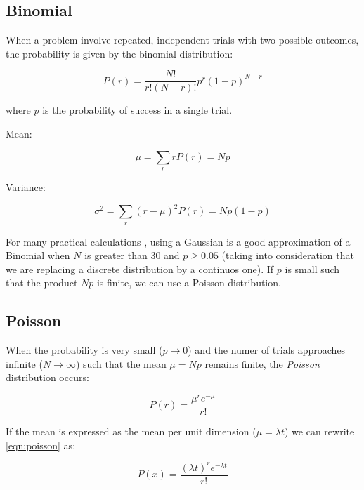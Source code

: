 \subsection{Binomial}

When a problem involve repeated, independent trials with two possible outcomes, the probability is given by the binomial distribution:

\begin{equation}
	P(r)= \frac{N! }{ r! \left( N-r \right)! } p^r (1-p)^{N-r}
\end{equation}

where $p$ is the probability of success in a single trial.

Mean:

\begin{equation}
	\mu = \sum_{r}rP(r) = Np
\end{equation}

Variance:

\begin{equation}
	\sigma^2=\sum_r(r-\mu)^2P(r) = Np(1-p)
\end{equation}

For many practical calculations \cite{leo2012techniques}, using a Gaussian is a good approximation of a Binomial when $N$ is greater than 30 and $p\geq0.05$ (taking into consideration that we are replacing a discrete distribution by a continuos one). If $p$ is small such that the product $Np$ is finite, we can use a Poisson distribution.

\subsection{Poisson}
\label{distributions1}

When the probability is very small ($p \rightarrow 0$) and the numer of trials approaches infinite ($N \rightarrow \infty$) such that the mean $\mu = N p$ remains finite, the \textit{Poisson} distribution occurs:


\begin{equation}
	\label{eqn:poisson}
	P\left( r \right) = \frac{{\mu^{ r } e ^{-\mu} }}{{r!}}
\end{equation}

If the mean is expressed as the mean per unit dimension ($\mu = \lambda t$) we can rewrite \ref{eqn:poisson} as:

\begin{equation}
	P\left( x \right) = \frac{(\lambda t) ^r {e^{ - \lambda t}} }{{r!}}
\end{equation}


